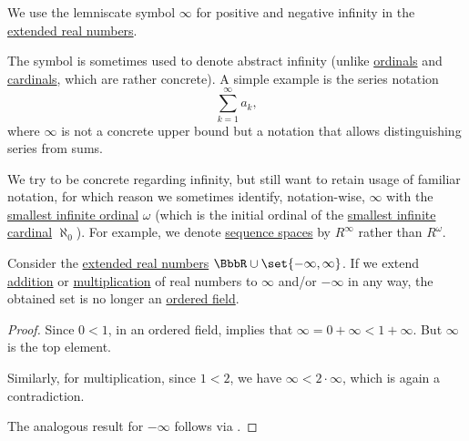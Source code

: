 \begin{remark}\label{rem:lemniscate_symbol}
  We use the lemniscate symbol \( \infty \) for positive and negative infinity in the \hyperref[def:extended_real_numbers]{extended real numbers}.

  The symbol is sometimes used to denote abstract infinity (unlike \hyperref[def:ordinal]{ordinals} and \hyperref[def:cardinal]{cardinals}, which are rather concrete). A simple example is the series notation
  \begin{equation*}
    \sum_{k=1}^\infty a_k,
  \end{equation*}
  where \( \infty \) is not a concrete upper bound but a notation that allows distinguishing series from sums.

  We try to be concrete regarding infinity, but still want to retain usage of familiar notation, for which reason we sometimes identify, notation-wise, \( \infty \) with the \hyperref[thm:omega_is_an_ordinal]{smallest infinite ordinal} \( \omega \) (which is the initial ordinal of the \hyperref[def:aleph_hierarchy]{smallest infinite cardinal} \( \aleph_0 \)). For example, we denote \hyperref[def:sequence_space]{sequence spaces} by \( R^\infty \) rather than \( R^\omega \).
\end{remark}

\begin{proposition}\label{thm:extended_real_numbers_are_not_ordered_field}
  Consider the \hyperref[def:extended_real_numbers]{extended real numbers} \( \BbbR \cup \set{ -\infty, \infty } \). If we extend \hyperref[def:real_number_arithmetic/addition]{addition} or \hyperref[def:real_number_arithmetic/multiplication]{multiplication} of real numbers to \( \infty \) and/or \( -\infty \) in any way, the obtained set is no longer an \hyperref[def:ordered_semiring]{ordered field}.
\end{proposition}
\begin{proof}
  Since \( 0 < 1 \), in an ordered field,  implies that \( \infty = 0 + \infty < 1 + \infty \). But \( \infty \) is the top element.

  Similarly, for multiplication, since \( 1 < 2 \), we have \( \infty < 2 \cdot \infty \), which is again a contradiction.

  The analogous result for \( -\infty \) follows via .
\end{proof}

